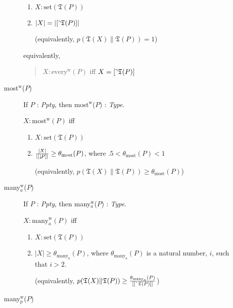 \begin{description}
\begin{description}
\begin{enumerate}
\item $X:\mathrm{set}(\mathfrak{T}(P))$ 
 
\item $|X|=|[\ \!\check{}\ \!\mathfrak{T}(P)]|$

  (equivalently, $p(\mathfrak{T}(X)\|\mathfrak{T}(P))=1$)
 
\end{enumerate}
equivalently,
\begin{quote}
  $X:\text{every}^{\text{w}}(P)$ iff $X=[\ \!\check{}\ \!\mathfrak{T}(P)]$
\end{quote}


\item[\textnormal{most$^{\text{w}}$($P$)}] \mbox{}

  If $P$ : \textit{Ppty}, then most$^{\text{w}}$($P$) : \textit{Type}.

  $X:\text{most}^{\text{w}}(P)$ iff
\begin{enumerate} 
 
\item $X:\mathrm{set}(\mathfrak{T}(P))$ 
 
\item $\frac{|X|}{|[\downarrow\!P]|}\geq\theta_{\text{most}}(P)$, where
  $.5<\theta_{\text{most}}(P)<1$

  (equivalently, $p(\mathfrak{T}(X)\|\mathfrak{T}(P))\geq\theta_{\text{most}}(P)$)
 
\end{enumerate}

\item[\textnormal{many$_a^{\text{w}}$($P$)}] \mbox{}

  If $P$ : \textit{Ppty}, then many$_a^{\text{w}}$($P$) :
  \textit{Type}.

  $X:\text{many}_a^{\text{w}}(P)$ iff
\begin{enumerate} 
 
\item $X:\mathrm{set}(\mathfrak{T}(P))$ 
 
\item $|X|\geq\theta_{\text{many}_a}(P)$, where
  $\theta_{\text{many}_a}(P)$ is a natural number, $i$, such that
  $i>2$.

  (equivalently, $p(\mathfrak{T}(X)\|\mathfrak{T}(P))\geq\frac{\theta_{\text{many}_a}(P)}{[[\ \!\check{}\ \!\mathfrak{T}(P)]]}$)
 
\end{enumerate}

\item[\textnormal{many$_p^{\text{w}}$($P$)}] \mbox{}


\end{description}
\end{description}
